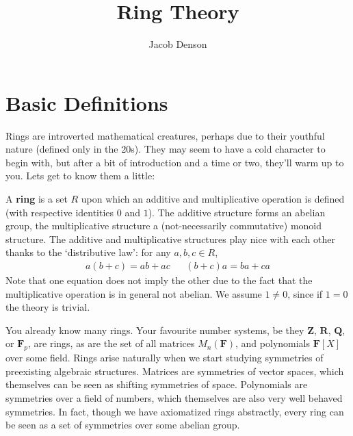 

\title{Ring Theory}
\author{Jacob Denson}



\maketitle
\tableofcontents

\chapter{Basic Definitions}


Rings are introverted mathematical creatures, perhaps due to their youthful nature (defined only in the 20s). They may seem to have a cold character to begin with, but after a bit of introduction and a time or two, they'll warm up to you. Lets get to know them a little:

\begin{definition}
    A {\bf ring} is a set $R$ upon which an additive and multiplicative operation is defined (with respective identities $0$ and $1$). The additive structure forms an abelian group, the multiplicative structure a (not-necessarily commutative) monoid structure. The additive and multiplicative structures play nice with each other thanks to the `distributive law': for any $a, b, c \in R$,
    \begin{align*}
        a(b + c) = ab + ac && (b + c)a = ba + ca
    \end{align*}
    Note that one equation does not imply the other due to the fact that the multiplicative operation is in general not abelian. We assume $1 \neq 0$, since if $1 = 0$ the theory is trivial.
\end{definition}

You already know many rings. Your favourite number systems, be they $\mathbf{Z}$, $\mathbf{R}$, $\mathbf{Q}$, or $\mathbf{F}_p$, are rings, as are the set of all matrices $M_n(\mathbf{F})$, and polynomials $\mathbf{F}[X]$ over some field. Rings arise naturally when we start studying symmetries of preexisting algebraic structures. Matrices are symmetries of vector spaces, which themselves can be seen as shifting symmetries of space. Polynomials are symmetries over a field of numbers, which themselves are also very well behaved symmetries. In fact, though we have axiomatized rings abstractly, every ring can be seen as a set of symmetries over some abelian group.

